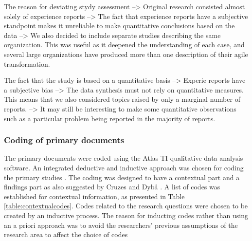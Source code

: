 \documentclass[preprint,authoryear,12pt]{elsarticle}
\begin{document}
The reason for deviating stydy assessment
--> Original research consisted almost solely of experience reports
--> The fact that experience reports have a subjective standpoint makes it
    unreliable to make quantitative conclusions based on the data
--> We also decided to include separate studies describing the same organization.
    This was useful as it deepened the understanding of each case, and several
    large organizations have produced more than one description of their agile
    transformation.

The fact that the study is based on a quantitative basis
--> Experie reports have a subjective bias
--> The data synthesis must not rely on quantitative measures. This means that
    we also considered topics raised by only a marginal number of reports.
--> It may still be interesting to make some quantitative observations such as
    a particular problem being reported in the majority of reports.


\subsubsection{Coding of primary documents}

The primary documents were coded using the Atlas TI qualitative data analysis software.
An integrated deductive and inductive approach was chosen for coding the primary
studies \cite{Cruzes2011a}. The coding was designed to have a contextual part
and a findings part as also suggested by Cruzes and Dybå \cite{Cruzes2011a}. A
list of codes was established for contextual information, as presented in Table
\ref{table:contextualcodes}. Codes related to the research questions were chosen
to be created by an inductive process. The reason for inducting codes rather
than using an a priori approach was to avoid the researchers' previous
assumptions of the research area to affect the choice of codes
\end{document}
